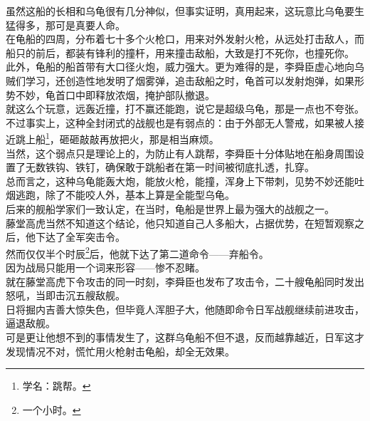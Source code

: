 \begin{multicols}{\theparacolNo}
虽然这船的长相和乌龟很有几分神似，但事实证明，真用起来，这玩意比乌龟要生猛得多，那可是真要人命。\\

在龟船的四周，分布着七十多个火枪口，用来对外发射火枪，从远处打击敌人，而船只的前后，都装有锋利的撞杆，用来撞击敌船，大致是打不死你，也撞死你。\\

此外，龟船的船首带有大口径火炮，威力强大。更为难得的是，李舜臣虚心地向乌贼们学习，还创造性地发明了烟雾弹，追击敌船之时，龟首可以发射炮弹，如果形势不妙，龟首口中即释放浓烟，掩护部队撤退。\\

就这么个玩意，远轰近撞，打不赢还能跑，说它是超级乌龟，那是一点也不夸张。\\

不过事实上，这种全封闭式的战舰也是有弱点的：由于外部无人警戒，如果被人接近跳上船\footnote{学名：跳帮。}，砸砸敲敲再放把火，那是相当麻烦。\\

当然，这个弱点只是理论上的，为防止有人跳帮，李舜臣十分体贴地在船身周围设置了无数铁钩、铁钉，确保敢于跳船者在第一时间被彻底扎透，扎穿。\\

总而言之，这种乌龟能轰大炮，能放火枪，能撞，浑身上下带刺，见势不妙还能吐烟逃跑，除了不能咬人外，基本上算是全能型乌龟。\\

后来的舰船学家们一致认定，在当时，龟船是世界上最为强大的战舰之一。\\

藤堂高虎当然不知道这个结论，他只知道自己人多船大，占据优势，在短暂观察之后，他下达了全军突击令。\\

然而仅仅半个时辰\footnote{一个小时。}后，他就下达了第二道命令——弃船令。\\

因为战局只能用一个词来形容——惨不忍睹。\\

就在藤堂高虎下令攻击的同一时刻，李舜臣也发布了攻击令，二十艘龟船同时发出怒吼，当即击沉五艘敌舰。\\

日将掘内吉善大惊失色，但毕竟人浑胆子大，他随即命令日军战舰继续前进攻击，逼退敌舰。\\

可是更让他想不到的事情发生了，这群乌龟船不但不退，反而越靠越近，日军这才发现情况不对，慌忙用火枪射击龟船，却全无效果。\\


\end{multicols}
